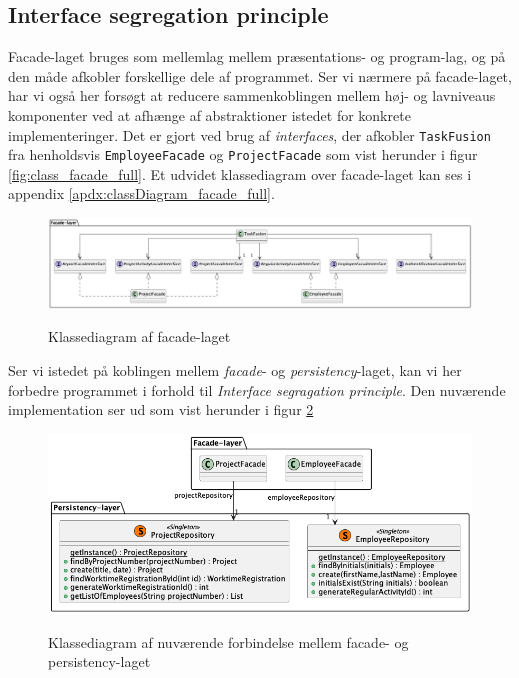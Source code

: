 \subsection{Interface segregation principle} \label{sec:solid_i}
Facade-laget bruges som mellemlag mellem præsentations- og program-lag, og på den måde afkobler forskellige dele af programmet. Ser vi nærmere på facade-laget, har vi også her forsøgt at reducere sammenkoblingen mellem høj- og lavniveaus komponenter ved at afhænge af abstraktioner istedet for konkrete implementeringer. Det er gjort ved brug af \textit{interfaces}, der afkobler \texttt{TaskFusion} fra henholdsvis \texttt{EmployeeFacade} og \texttt{ProjectFacade} som vist herunder i figur \ref{fig:class_facade_full}. Et udvidet klassediagram over facade-laget kan ses i appendix \ref{apdx:classDiagram_facade_full}.

\begin{figure}[H]
    \centering
    \caption{Klassediagram af facade-laget}
    \includegraphics[width = \textwidth, keepaspectratio]{TaskFusion/out/assets/diagrams/class_facade_layer_simple/ClassDiagram_facade_simple.png}
    \label{fig:class_facade_simple}
\end{figure}

Ser vi istedet på koblingen mellem \textit{facade}- og \textit{persistency}-laget, kan vi her forbedre programmet i forhold til \textit{Interface segragation principle}. Den nuværende implementation ser ud som vist herunder i figur \ref{fig:class_facade_persistency_current}

\begin{figure}[H]
    \centering
    \caption{Klassediagram af nuværende forbindelse mellem facade- og persistency-laget}
    \includegraphics[width = 12cm, keepaspectratio]{TaskFusion/out/assets/diagrams/class_persistency_to_facade/persistency_to_facade_example.png}
    \label{fig:class_facade_persistency_current}
\end{figure}

